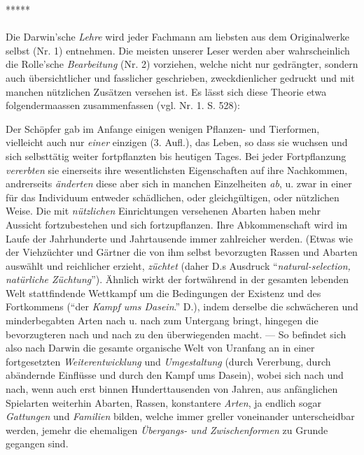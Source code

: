 \documentclass[a4paper, 11pt, oneside, english]{article}
\begin{document}
\centerline{*\hspace{15mm}*\hspace{15mm}*\hspace{15mm}*\hspace{15mm}*}
\bigskip

\paragraph{}
Die Darwin'sche \emph{Lehre} wird jeder Fachmann am liebsten aus dem Originalwerke selbst (Nr. 1) entnehmen. Die meisten unserer Leser werden aber wahrscheinlich die Rolle'sche \emph{Bearbeitung} (Nr. 2) vorziehen, welche nicht nur gedrängter, sondern auch übersichtlicher und fasslicher geschrieben, zweckdienlicher gedruckt und mit manchen nützlichen Zusätzen versehen ist. Es lässt sich diese Theorie etwa folgendermaassen zusammenfassen (vgl. Nr. 1. S. 528):

Der Schöpfer gab im Anfange einigen wenigen Pflanzen- und Tierformen, vielleicht auch nur \emph{einer} einzigen (3. Aufl.), das Leben, so dass sie wuchsen und sich selbsttätig weiter fortpflanzten bis heutigen Tages. Bei jeder Fortpflanzung \emph{vererbten} sie einerseits ihre wesentlichsten Eigenschaften auf ihre Nachkommen, andrerseits \emph{änderten} diese aber sich in manchen Einzelheiten \emph{ab}, u. zwar in einer für das Individuum entweder schädlichen, oder gleichgültigen, oder nützlichen Weise. Die mit \emph{nützlichen} Einrichtungen versehenen Abarten haben mehr Aussicht fortzubestehen und sich fortzupflanzen. Ihre Abkommenschaft wird im Laufe der Jahrhunderte und Jahrtausende immer zahlreicher werden. (Etwas wie der Viehzüchter und Gärtner die von ihm selbst bevorzugten Rassen und Abarten auswählt und reichlicher erzieht, \emph{züchtet} (daher D.s Ausdruck "`\emph{natural-selection, natürliche Züchtung}"'). Ähnlich wirkt der fortwährend in der gesamten lebenden Welt stattfindende Wettkampf um die Bedingungen der Existenz und des Fortkommens ("`der \emph{Kampf ums Dasein}."' D.), indem derselbe die schwächeren und minderbegabten Arten nach u. nach zum Untergang bringt, hingegen die bevorzugteren nach und nach zu den überwiegenden macht. --- So befindet sich also nach Darwin die gesamte organische Welt von Uranfang an in einer fortgesetzten \emph{Weiterentwicklung} und \emph{Umgestaltung} (durch Vererbung, durch abändernde Einflüsse und durch den Kampf ums Dasein), wobei sich nach und nach, wenn auch erst binnen Hunderttausenden von Jahren, aus anfänglichen Spielarten weiterhin Abarten, Rassen, konstantere \emph{Arten}, ja endlich sogar \emph{Gattungen} und \emph{Familien} bilden, welche immer greller voneinander unterscheidbar werden, jemehr die ehemaligen \emph{Übergangs- und Zwischenformen} zu Grunde gegangen sind.
\end{document}
